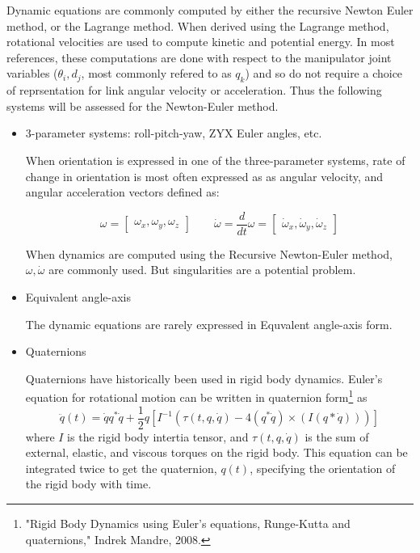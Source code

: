 Dynamic equations are commonly computed by either the recursive Newton Euler method, or the Lagrange method.
When derived using the Lagrange method, rotational velocities are used to compute  kinetic and potential energy.  In most references, these computations are done with respect to the manipulator joint variables ($\theta_i, d_j$, most commonly refered to as $q_k$) and so do not require a choice of reprsentation for link angular velocity or acceleration.   Thus the following systems will be assessed for the Newton-Euler method.



\begin{itemize}
  \item 3-parameter systems:  roll-pitch-yaw,  ZYX Euler angles,  etc.



When orientation is expressed in one of the three-parameter systems, rate of change in orientation is most often expressed as as angular velocity, and angular acceleration vectors defined as:

\[
\omega = \begin{bmatrix} \omega_x, \omega_y, \omega_z \end{bmatrix}
\qquad
\dot{\omega} = \frac{d}{dt}\omega =  \begin{bmatrix} \dot{\omega}_x, \dot{\omega}_y, \dot{\omega}_z \end{bmatrix}
\]


When dynamics are computed using the Recursive Newton-Euler method,
$\omega, \dot{\omega}$ are commonly used.  But singularities are a potential problem.





  \item Equivalent angle-axis

The dynamic equations are rarely expressed in Equvalent angle-axis form.


  \item Quaternions

Quaternions have historically been used in rigid body dynamics.   Euler's equation for rotational motion can be written in quaternion form\footnote{"Rigid Body Dynamics using Euler's equations, Runge-Kutta and quaternions," Indrek Mandre, 2008.} as
\[
\ddot{q}(t) = \dot{q}q^*\dot{q}+ \frac12q\left[I^{-1}(\tau(t,q,\dot{q})-4(q^*\dot{q})\times(I(q*\dot{q})))\right]
\]
where $I$ is the rigid body intertia tensor, and $\tau(t,q,\dot{q})$ is the sum of external, elastic, and viscous torques on the rigid body.  This equation can be integrated twice to get the quaternion, $q(t)$, specifying the orientation of the rigid body with time.




\end{itemize}
